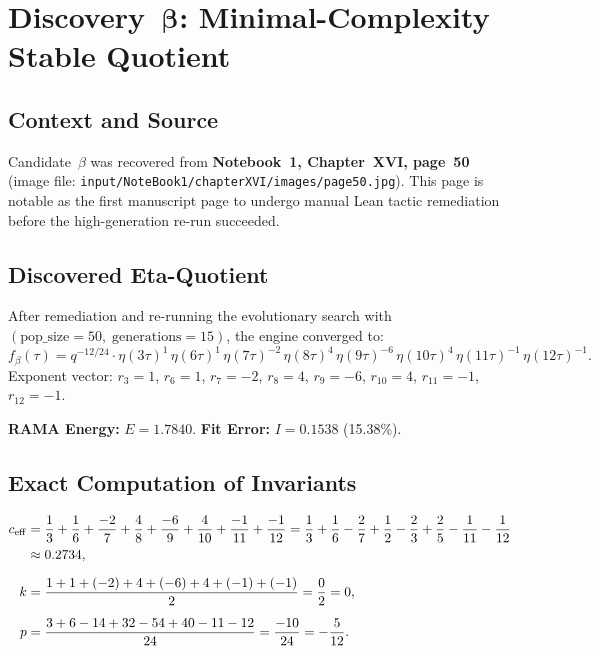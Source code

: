 \section{Discovery~$\boldsymbol{\beta}$: Minimal-Complexity Stable Quotient}
\label{sec:candidate_beta}

\subsection{Context and Source}

Candidate~$\beta$ was recovered from \textbf{Notebook~1,
Chapter~XVI, page~50} (image file:
\texttt{input/NoteBook1/chapterXVI/images/page50.jpg}).
This page is notable as the first manuscript page to undergo
manual Lean tactic remediation before the high-generation
re-run succeeded.

\subsection{Discovered Eta-Quotient}

After remediation and re-running the evolutionary search with
$(\text{pop\_size}=50,\;\text{generations}=15)$, the engine
converged to:
\begin{equation}
  \label{eq:beta_quotient}
  f_\beta(\tau) = q^{-12/24} \cdot
  \eta(3\tau)^{1} \,
  \eta(6\tau)^{1} \,
  \eta(7\tau)^{-2} \,
  \eta(8\tau)^{4} \,
  \eta(9\tau)^{-6} \,
  \eta(10\tau)^{4} \,
  \eta(11\tau)^{-1} \,
  \eta(12\tau)^{-1}.
\end{equation}
Exponent vector: $r_3=1$, $r_6=1$, $r_7=-2$, $r_8=4$,
$r_9=-6$, $r_{10}=4$, $r_{11}=-1$, $r_{12}=-1$.

\textbf{RAMA Energy:} $E = 1.7840$. \quad
\textbf{Fit Error:} $I = 0.1538$ (15.38\%).

\subsection{Exact Computation of Invariants}

\begin{proposition}
\label{prop:beta_invariants}
\begin{align}
  c_{\mathrm{eff}} &= \frac{1}{3} + \frac{1}{6} + \frac{-2}{7}
  + \frac{4}{8} + \frac{-6}{9} + \frac{4}{10}
  + \frac{-1}{11} + \frac{-1}{12}
  = \frac{1}{3} + \frac{1}{6} - \frac{2}{7}
  + \frac{1}{2} - \frac{2}{3} + \frac{2}{5}
  - \frac{1}{11} - \frac{1}{12} \notag\\
  &\approx 0.2734, \\[6pt]
  k &= \frac{1+1+(-2)+4+(-6)+4+(-1)+(-1)}{2} = \frac{0}{2} = 0, \\[6pt]
  p &= \frac{3+6-14+32-54+40-11-12}{24} = \frac{-10}{24}
  = -\frac{5}{12}.
\end{align}
\end{proposition}

